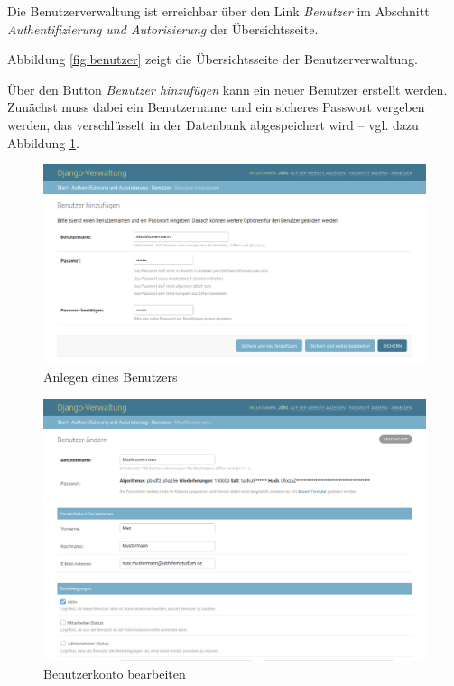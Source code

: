\documentclass[a4paper,11pt,listof=numbered,glossary=totoc,parskip=half,toc=bib]{scrreprt}
\begin{document}
\begin{appendices}
	Die Benutzerverwaltung ist erreichbar über den Link \textit{Benutzer} im Abschnitt \textit{Authentifizierung und Autorisierung} der Übersichtsseite.
	
	Abbildung \ref{fig:benutzer} zeigt die Übersichtsseite der Benutzerverwaltung.
	
	Über den Button \textit{Benutzer hinzufügen} kann ein neuer Benutzer erstellt werden. Zunächst muss dabei ein Benutzername und ein sicheres Passwort vergeben werden, das verschlüsselt in der Datenbank abgespeichert wird -- vgl. dazu Abbildung \ref{fig:neuerbenutzer}.
	
	\begin{figure}
		\centering
		\includegraphics[width=\textwidth]{neuerbenutzer}
		\caption{Anlegen eines Benutzers}
		\label{fig:neuerbenutzer}
	\end{figure}
	
	\begin{figure}
		\centering
		\includegraphics[width=\textwidth]{editbenutzer}
		\caption{Benutzerkonto bearbeiten}
		\label{fig:editbenutzer}
	\end{figure}
	

\end{appendices}
\end{document}
